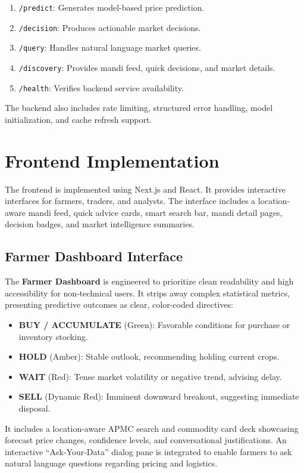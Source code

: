 \documentclass[12pt,a4paper]{report}
\begin{document}
\begin{enumerate}
    \item \texttt{/predict}: Generates model-based price prediction.
    \item \texttt{/decision}: Produces actionable market decisions.
    \item \texttt{/query}: Handles natural language market queries.
    \item \texttt{/discovery}: Provides mandi feed, quick decisions, and market details.
    \item \texttt{/health}: Verifies backend service availability.
\end{enumerate}

The backend also includes rate limiting, structured error handling, model initialization, and cache refresh support.

\section{Frontend Implementation}

The frontend is implemented using Next.js and React. It provides interactive interfaces for farmers, traders, and analysts. The interface includes a location-aware mandi feed, quick advice cards, smart search bar, mandi detail pages, decision badges, and market intelligence summaries.

\subsection{Farmer Dashboard Interface}

The \textbf{Farmer Dashboard} is engineered to prioritize clean readability and high accessibility for non-technical users. It strips away complex statistical metrics, presenting predictive outcomes as clear, color-coded directives:
\begin{itemize}
    \item \textbf{BUY / ACCUMULATE} (Green): Favorable conditions for purchase or inventory stocking.
    \item \textbf{HOLD} (Amber): Stable outlook, recommending holding current crops.
    \item \textbf{WAIT} (Red): Tense market volatility or negative trend, advising delay.
    \item \textbf{SELL} (Dynamic Red): Imminent downward breakout, suggesting immediate disposal.
\end{itemize}

It includes a location-aware APMC search and commodity card deck showcasing forecast price changes, confidence levels, and conversational justifications. An interactive ``Ask-Your-Data'' dialog pane is integrated to enable farmers to ask natural language questions regarding pricing and logistics.
\end{document}
